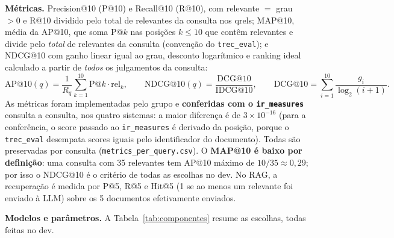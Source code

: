 \documentclass[10pt,a4paper]{article}
\begin{document}
\textbf{Métricas.} Precision@10 (P@10) e Recall@10 (R@10), com relevante $=$ grau $> 0$ e R@10 dividido pelo total de relevantes da consulta nos qrels; MAP@10, média da AP@10, que soma P@$k$ nas posições $k \le 10$ que contêm relevantes e divide pelo \emph{total} de relevantes da consulta (convenção do \texttt{trec\_eval}); e NDCG@10 com ganho linear igual ao grau, desconto logarítmico e ranking ideal calculado a partir de \emph{todos} os julgamentos da consulta:
\[
\mathrm{AP@10}(q) = \frac{1}{R_q}\sum_{k=1}^{10} \mathrm{P@}k \cdot \mathrm{rel}_k, \qquad
\mathrm{NDCG@10}(q) = \frac{\mathrm{DCG@10}}{\mathrm{IDCG@10}}, \qquad
\mathrm{DCG@10} = \sum_{i=1}^{10} \frac{g_i}{\log_2(i+1)}.
\]
As métricas foram implementadas pelo grupo e \textbf{conferidas com o \texttt{ir\_measures}} consulta a consulta, nos quatro sistemas: a maior diferença é de $3 \times 10^{-16}$ (para a conferência, o score passado ao \texttt{ir\_measures} é derivado da posição, porque o \texttt{trec\_eval} desempata scores iguais pelo identificador do documento). Todas são preservadas por consulta (\texttt{metrics\_per\_query.csv}). O \textbf{MAP@10 é baixo por definição}: uma consulta com 35 relevantes tem AP@10 máximo de $10/35 \approx 0{,}29$; por isso o NDCG@10 é o critério de todas as escolhas no dev. No RAG, a recuperação é medida por P@5, R@5 e Hit@5 (1 se ao menos um relevante foi enviado à LLM) sobre os 5 documentos efetivamente enviados.

\textbf{Modelos e parâmetros.} A Tabela~\ref{tab:componentes} resume as escolhas, todas feitas no dev.
\end{document}
